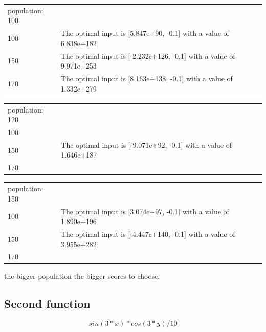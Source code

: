 \documentclass[a4paper, 12pt]{article}
\begin{document}
	\begin{table}[!h]
	\begin{tabular}{lllll}
		population: 100 &                                                                         &  &  &  \\
		100      & The optimal input is [5.847e+90, -0.1] with a value of 6.838e+182
		   &  &  &  \\
		150      & The optimal input is [-2.232e+126, -0.1] with a value of 9.971e+253
		 &  &  &  \\
		170      & The optimal input is [8.163e+138, -0.1] with a value of 1.332e+279  &  &  & 
	\end{tabular}
\end{table}

\begin{table}[!h]
	\begin{tabular}{lllll}
		population: 120 &                                                                         &  &  &  \\
		100      &    &  &  &  \\
		150      & The optimal input is [-9.071e+92, -0.1] with a value of 1.646e+187 &  &  &  \\
		170      &   &  &  & 
	\end{tabular}
\end{table}

\begin{table}[!h]
	\begin{tabular}{lllll}
		population: 150 &                                                                         &  &  &  \\
		100      & The optimal input is [3.074e+97, -0.1] with a value of 1.890e+196   &  &  &  \\
		150      & The optimal input is [-4.447e+140, -0.1] with a value of 3.955e+282 &  &  &  \\
		170      &  &  &  & 
	\end{tabular}
\end{table}

the bigger population the bigger scores to choose.

\subsection{Second function}

 \[sin(3*x) * cos(3*y) / 10\]
 
 
\end{document}
